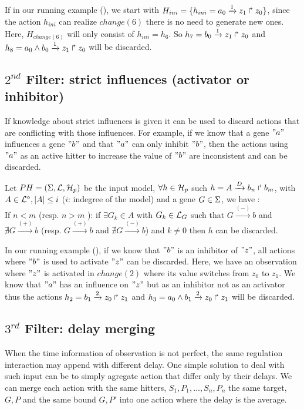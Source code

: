 If in our running example (),
we start with $H_{ini}=\{h_{ini}=a_0\xrightarrow{1} z_1 \Rsh z_0\}$,
since the action $h_{ini}$ can realize $change(6)$ there is no need to generate new ones.
Here, $H_{change(6)}$ will only consist of $h_{ini} = h_6$. So $h_7=b_0\xrightarrow{1} z_1 \Rsh z_0$ and $h_8=a_0 \wedge b_0 \xrightarrow{1} z_1 \Rsh z_0 $ will be discarded. 

\subsection{$2^{nd}$ Filter: strict influences (activator or inhibitor)}

If knowledge about strict influences is given it can be used to discard actions that are conflicting with those influences.
For example, if we know that a gene $"a"$ influences a gene $"b"$ and that $"a"$ can only inhibit $"b"$, then the actions using $"a"$ as an active hitter to increase the value of $"b"$ are inconsistent and can be discarded.

\begin{definition}
Let $PH=(\Sigma,\mathcal{L},\mathcal{H}_p)$ be the input model, $\forall h \in \mathcal{H}_p$ such $h=A\xrightarrow{D} b_n \Rsh b_m$, with $ A \in \mathcal{L}^{\diamond}, | A| \leq i$ ($i$: indegree of the model) and a gene $G \in \Sigma$, we have :\\
If $n < m$ (resp. $n > m$ ): if $\exists G_k \in A $ with $G_k \in \mathcal{L}_G $ such that $G \xrightarrow{(-)} b$ and $\nexists G \xrightarrow{(+)} b$ (resp. $G \xrightarrow{(+)} b$ and $\nexists G \xrightarrow{(-)} b$) and $k \neq 0$ then $h$ can be discarded.
\end{definition}

In our running example (), if we know that $"b"$ is an inhibitor of $"z"$, all actions where $"b"$ is used to activate $"z"$ can be discarded.
Here, we have an observation where $"z"$ is activated in $change(2)$ where its value switches from $z_0$ to $z_1$.
We know that $"a"$ has an influence on $"z"$ but as an inhibitor not as an activator thus the actions $h_2=b_1\xrightarrow{2} z_0 \Rsh z_1$ and $h_3=a_0 \wedge b_1 \xrightarrow{2} z_0 \Rsh z_1$ will be discarded.

\subsection{$3^{rd}$ Filter: delay merging}

When the time information of observation is not perfect, the same regulation interaction may append with different delay.
One simple solution to deal with such input can be to simply agregate action that differ only by their delays.
We can merge each action with the same hitters, $S_1,P_1,\ldots, S_n,P_n$ the same target, $G, P$ and the same bound $G, P'$ into one action where the delay is the average.

